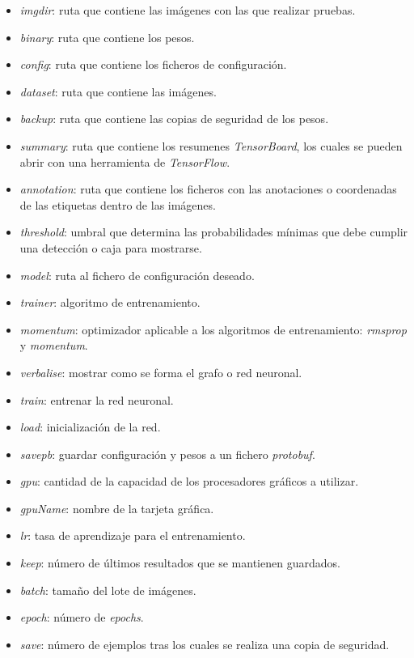 \begin{itemize}
	\item \textit{imgdir}: ruta que contiene las imágenes con las que realizar pruebas.
	\item \textit{binary}: ruta que contiene los pesos.
	\item \textit{config}: ruta que contiene los ficheros de configuración.
	\item \textit{dataset}: ruta que contiene las imágenes.
	\item \textit{backup}: ruta que contiene las copias de seguridad de los pesos.
	\item \textit{summary}: ruta que contiene los resumenes \textit{TensorBoard}, los cuales se pueden abrir con una herramienta de \textit{TensorFlow}.
	\item \textit{annotation}: ruta que contiene los ficheros con las anotaciones o coordenadas de las etiquetas dentro de las imágenes.
	\item \textit{threshold}: umbral que determina las probabilidades mínimas que debe cumplir una detección o caja para mostrarse.
	\item \textit{model}: ruta al fichero de configuración deseado.
	\item \textit{trainer}: algoritmo de entrenamiento.
	\item \textit{momentum}: optimizador aplicable a los algoritmos de entrenamiento: \textit{rmsprop} y \textit{momentum}.
	\item \textit{verbalise}: mostrar como se forma el grafo o red neuronal.
	\item \textit{train}: entrenar la red neuronal.
	\item \textit{load}: inicialización de la red.
	\item \textit{savepb}: guardar configuración y pesos a un fichero \textit{protobuf}.
	\item \textit{gpu}: cantidad de la capacidad de los procesadores gráficos a utilizar.
	\item \textit{gpuName}: nombre de la tarjeta gráfica.
	\item \textit{lr}: tasa de aprendizaje para el entrenamiento.
	\item \textit{keep}: número de últimos resultados que se mantienen guardados.
	\item \textit{batch}: tamaño del lote de imágenes.
	\item \textit{epoch}: número de \textit{epochs}.
	\item \textit{save}: número de ejemplos tras los cuales se realiza una copia de seguridad.

\end{itemize}
